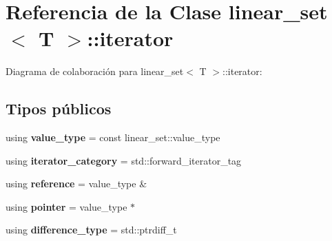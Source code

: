 \hypertarget{classlinear__set_1_1iterator}{}\section{Referencia de la Clase linear\+\_\+set$<$ T $>$\+:\+:iterator}
\label{classlinear__set_1_1iterator}


Diagrama de colaboración para linear\+\_\+set$<$ T $>$\+:\+:iterator\+:
\subsection*{Tipos públicos}
\begin{DoxyCompactItemize}
\item 
\mbox{\label{classlinear__set_1_1iterator_adc428ae224f2e66cded571df340b814e}} 
using {\bfseries value\+\_\+type} = const linear\+\_\+set\+::value\+\_\+type
\item 
\mbox{\label{classlinear__set_1_1iterator_ac70b54cbde97e1a59bc002979633aa41}} 
using {\bfseries iterator\+\_\+category} = std\+::forward\+\_\+iterator\+\_\+tag
\item 
\mbox{\label{classlinear__set_1_1iterator_a1394508ada8427ad0b5764794ea59473}} 
using {\bfseries reference} = value\+\_\+type \&
\item 
\mbox{\label{classlinear__set_1_1iterator_a4334a22789e11ff18a1b31982a20f944}} 
using {\bfseries pointer} = value\+\_\+type $\ast$
\item 
\mbox{\label{classlinear__set_1_1iterator_aca6addc2ad85f15d075c225c4ad3a085}} 
using {\bfseries difference\+\_\+type} = std\+::ptrdiff\+\_\+t
\end{DoxyCompactItemize}
